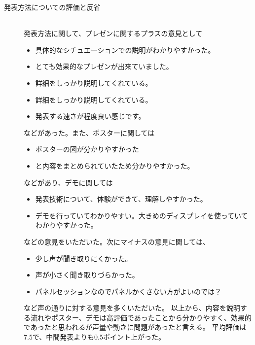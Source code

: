 \documentclass[openany,11pt,papersize]{jsbook}
\begin{document}
\begin{description}
\item[発表方法についての評価と反省]\mbox{}\\
発表方法に関して、プレゼンに関するプラスの意見として
\begin{itemize}

\item 具体的なシチュエーションでの説明がわかりやすかった。
\item とても効果的なプレゼンが出来ていました。
\item 詳細をしっかり説明してくれている。
\item 詳細をしっかり説明してくれている。
\item 発表する速さが程度良い感じです。

\end{itemize}

などがあった。また、ポスターに関しては
\begin{itemize}

\item ポスターの図が分かりやすかった
\item と内容をまとめられていたため分かりやすかった。

\end{itemize}

などがあり、デモに関しては
\begin{itemize}

\item 発表技術について、体験ができて、理解しやすかった。
\item デモを行っていてわかりやすい。大きめのディスプレイを使っていてわかりやすかった。

\end{itemize}

などの意見をいただいた。次にマイナスの意見に関しては、
\begin{itemize}

\item 少し声が聞き取りにくかった。
\item 声が小さく聞き取りづらかった。
\item パネルセッションなのでパネルかくさない方がよいのでは？

\end{itemize}
など声の通りに対する意見を多くいただいた。
以上から、内容を説明する流れやポスター、デモは高評価であったことから分かりやすく、効果的であったと思われるが声量や動きに問題があったと言える。
平均評価は7.5で、中間発表よりも0.5ポイント上がった。


\end{description}
\end{document}
